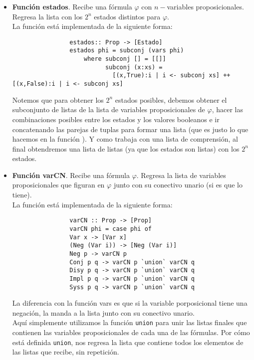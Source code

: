 \documentclass[letterpaper,12pt]{article}
\begin{document}
\begin{itemize}
\begin{itemize}
            \item \textbf{Función estados}. Recibe una fórmula $\varphi$ con 
            $n-$variables proposicionales. Regresa la lista con los $2^{n}$
            estados distintos para $\varphi$. \\
            La función está implementada de la siguiente forma:
            \begin{lstlisting}
                estados:: Prop -> [Estado]
                estados phi = subconj (vars phi)
                    where subconj [] = [[]]
                          subconj (x:xs) = 
                            [(x,True):i | i <- subconj xs] ++ [(x,False):i | i <- subconj xs] 

            \end{lstlisting}

            Notemos que para obtener los $2^{n}$ estados posibles, debemos
            obtener el subconjunto de listas de la lista de variables 
            proposicionales de $\varphi$, hacer las combinaciones posibles 
            entre los estados y los valores booleanos e ir concatenando las 
            parejas de tuplas para formar una lista (que es justo lo que 
            hacemos en la función ). Y como  
            trabaja con una lista de comprensión, al final obtendremos una 
            lista de listas (ya que los estados son listas) con los
            $2^{n}$ estados.

            \item \textbf{Función varCN}. Recibe una fórmula $\varphi$. Regresa
            la lista de variables proposicionales que figuran en $\varphi$
            junto con su conectivo unario (si es que lo tiene). \\
            La función está implementada de la siguiente forma:
            \begin{lstlisting}
                varCN :: Prop -> [Prop]
                varCN phi = case phi of
                Var x -> [Var x]
                (Neg (Var i)) -> [Neg (Var i)]
                Neg p -> varCN p
                Conj p q -> varCN p `union` varCN q
                Disy p q -> varCN p `union` varCN q
                Impl p q -> varCN p `union` varCN q
                Syss p q -> varCN p `union` varCN q
            \end{lstlisting}

            La diferencia con la función vars es que si la variable 
            porposicional tiene una negación, la manda a la lista junto con
            su conectivo unario. \\
            Aquí simplemente utilizamos la función \texttt{union} para unir 
            las listas finales que contienen las variables proposicionales 
            de cada una de las fórmulas. Por cómo está definida 
            \texttt{union}, nos regresa la lista que contiene todos los 
            elementos de las listas que recibe, sin repetición.


\end{itemize}
\end{itemize}
\end{document}
